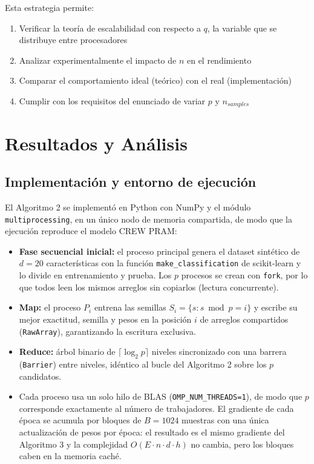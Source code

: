 \documentclass[11pt, a4paper]{article}
\begin{document}
Esta estrategia permite:
\begin{enumerate}
    \item Verificar la teoría de escalabilidad con respecto a $q$, la variable que se distribuye entre procesadores
    \item Analizar experimentalmente el impacto de $n$ en el rendimiento
    \item Comparar el comportamiento ideal (teórico) con el real (implementación)
    \item Cumplir con los requisitos del enunciado de variar $p$ y $n_{samples}$
\end{enumerate}


\section{Resultados y Análisis}
\label{sec:resultados}

\subsection{Implementación y entorno de ejecución}

El Algoritmo 2 se implementó en Python con NumPy y el módulo \texttt{multiprocessing}, en un único nodo de memoria compartida, de modo que la ejecución reproduce el modelo CREW PRAM:
\begin{itemize}
    \item \textbf{Fase secuencial inicial:} el proceso principal genera el dataset sintético de $d = 20$ características con la función \texttt{make\_classification} de scikit-learn y lo divide en entrenamiento y prueba. Los $p$ procesos se crean con \texttt{fork}, por lo que todos leen los mismos arreglos sin copiarlos (lectura concurrente).
    \item \textbf{Map:} el proceso $P_i$ entrena las semillas $S_i = \{s : s \bmod p = i\}$ y escribe su mejor exactitud, semilla y pesos en la posición $i$ de arreglos compartidos (\texttt{RawArray}), garantizando la escritura exclusiva.
    \item \textbf{Reduce:} árbol binario de $\lceil \log_2 p \rceil$ niveles sincronizado con una barrera (\texttt{Barrier}) entre niveles, idéntico al bucle del Algoritmo 2 sobre los $p$ candidatos.
    \item Cada proceso usa un solo hilo de BLAS (\texttt{OMP\_NUM\_THREADS=1}), de modo que $p$ corresponde exactamente al número de trabajadores. El gradiente de cada época se acumula por bloques de $B = 1024$ muestras con una única actualización de pesos por época: el resultado es el mismo gradiente del Algoritmo 3 y la complejidad $O(E \cdot n \cdot d \cdot h)$ no cambia, pero los bloques caben en la memoria caché.
\end{itemize}
\end{document}
